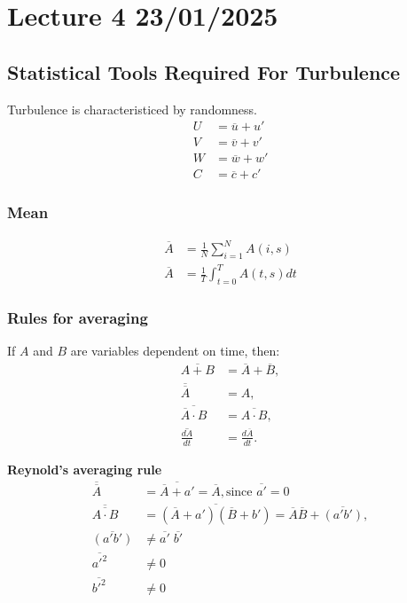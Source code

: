 \documentclass[fleqn,10pt]{SelfArx} %
\begin{document}
\clearpage

\section{Lecture 4 23/01/2025}
\subsection{Statistical Tools Required For Turbulence}

Turbulence is characteristiced by randomness.
\begin{align*}
	U & = \overline{u} + u' \\
	V & = \overline{v} + v' \\
	W & = \overline{w} + w' \\
	C & = \overline{c} + c'
\end{align*}

\subsubsection{Mean}
\begin{align*}
	\overline{A} & = \frac{1}{N}\sum^N_{i=1}A(i,s)   \\
	\overline{A} & = \frac{1}{T}\int^T_{t=0}A(t,s)dt
\end{align*}

\subsubsection{Rules for averaging}
If $A$ and $B$ are variables dependent on time, then:
\begin{align*}
	\overline{A + B}                & = \overline{A} + \overline{B}, \\
	\overline{\overline{A}}         & = A,                           \\
	\overline{\overline{A} \cdot B} & = \overline{A \cdot B},        \\
	\overline{\frac{dA}{dt}}        & = \frac{d\overline{A}}{dt}.
\end{align*}

\textbf{Reynold's averaging rule}
\begin{align*}
	\overline{\overline{A}}         & = \overline{\overline{A}+a'} = \overline{A}, \text{since } \overline{a'}=0                      \\
	\overline{\overline{A \cdot B}} & = \overline{(\overline{A}+a')(\overline{B}+b')} = \overline{A}\overline{B} + \overline{(a'b')}, \\
	\overline{(a'b')}               & \neq  \overline{a' } \; \overline{b'}                                                                \\
	\overline{a'^2}                 & \neq 0                                                                                          \\
	\overline{b'^2}                 & \neq 0
\end{align*}
\end{document}
